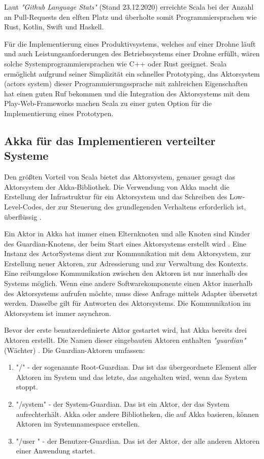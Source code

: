 Laut \textit{"Github Language Stats"} (Stand 23.12.2020) erreichte Scala bei der Anzahl an Pull-Requests den elften Platz und überholte somit Programmiersprachen wie Rust, Kotlin, Swift und Haskell.

Für die Implementierung eines Produktivsystems, welches auf einer Drohne läuft und auch Leistungsanforderungen des Betriebssystems einer Drohne erfüllt, wären solche Systemprogrammiersprachen wie C++ oder Rust geeignet. Scala ermöglicht aufgrund seiner Simplizität ein schnelles Prototyping, das Aktorsystem (actors system) dieser Programmierungssprache mit zahlreichen Eigenschaften hat einen guten Ruf bekommen und die Integration des Aktorsystems mit dem Play-Web-Frameworks machen Scala zu einer guten Option für die Implementierung eines Prototypen.

\subsection{Akka für das Implementieren verteilter Systeme}

Den größten Vorteil von Scala bietet das Aktorsystem, genauer gesagt das Aktorsystem der Akka-Bibliothek. Die Verwendung von Akka macht die Erstellung der Infrastruktur für ein Aktorsystem und das Schreiben des Low-Level-Codes, der zur Steuerung des grundlegenden Verhaltens erforderlich ist, überflüssig \cite{Odersky04anoverview}.

Ein Aktor in Akka hat immer einen Elternknoten und alle Knoten sind Kinder des Guardian-Knotens, der beim Start eines Aktorsystems erstellt wird \cite{akka}. Eine Instanz des ActorSystems dient zur Kommunikation mit dem Aktorsystem, zur Erstellung neuer Aktoren, zur Adressierung und zur Verwaltung des Kontexts. Eine reibungslose Kommunikation zwischen den Aktoren ist nur innerhalb des Systems möglich. Wenn eine andere Softwarekomponente einen Aktor innerhalb des Aktorsystems aufrufen möchte, muss diese Anfrage mittels Adapter übersetzt werden. Dasselbe gilt für Antworten des Aktorsystems. Die Kommunikation im Aktorsystem ist immer asynchron.

Bevor der erste benutzerdefinierte Aktor gestartet wird, hat Akka bereits drei Aktoren erstellt. Die Namen dieser eingebauten Aktoren enthalten \textit{"guardian"} (Wächter) \cite{akka}. Die Guardian-Aktoren umfassen:

\begin{enumerate}
	\item "/" - der sogenannte Root-Guardian. Das ist das übergeordnete Element aller Aktoren im System und das letzte, das angehalten wird, wenn das System stoppt.
	
	\item "/system" - der System-Guardian. Das ist ein Aktor, der das System aufrechterhält. Akka oder andere Bibliotheken, die auf Akka basieren, können Aktoren im Systemnamespace erstellen.
	
	\item "/user " - der Benutzer-Guardian. Das ist der Aktor, der alle anderen Aktoren einer Anwendung startet.
\end{enumerate}

